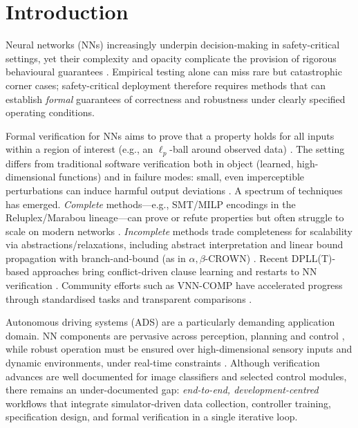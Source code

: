 
\section{Introduction}

Neural networks (NNs) increasingly underpin decision-making in safety-critical settings, yet their complexity and opacity complicate the provision of rigorous behavioural guarantees \cite{huang2020survey, liu2021algorithms}. Empirical testing alone can miss rare but catastrophic corner cases; safety-critical deployment therefore requires methods that can establish \emph{formal} guarantees of correctness and robustness under clearly specified operating conditions.

Formal verification for NNs aims to prove that a property holds for all inputs within a region of interest (e.g., an $\ell_p$-ball around observed data) \cite{katz2019marabou}. The setting differs from traditional software verification both in object (learned, high-dimensional functions) and in failure modes: small, even imperceptible perturbations can induce harmful output deviations \cite{carlini2019evaluating}. A spectrum of techniques has emerged. \emph{Complete} methods—e.g., SMT/MILP encodings in the Reluplex/Marabou lineage—can prove or refute properties but often struggle to scale on modern networks \cite{katz2017reluplex, katz2019marabou}. \emph{Incomplete} methods trade completeness for scalability via abstractions/relaxations, including abstract interpretation and linear bound propagation with branch-and-bound (as in $\alpha,\beta$-CROWN) \cite{gehr2018ai2, singh2019abstract, zhang2018efficient, xu2021fast, wang2021beta, zhou2024scalable}. Recent DPLL(T)-based approaches bring conflict-driven clause learning and restarts to NN verification \cite{duong2024dpllt}. Community efforts such as VNN-COMP have accelerated progress through standardised tasks and transparent comparisons \cite{bak2021second, brix2023fourth}.

Autonomous driving systems (ADS) are a particularly demanding application domain. NN components are pervasive across perception, planning and control \cite{bojarski2016end}, while robust operation must be ensured over high-dimensional sensory inputs and dynamic environments, under real-time constraints \cite{tran2020verification, dreossi2019verifai}. Although verification advances are well documented for image classifiers and selected control modules, there remains an under-documented gap: \emph{end-to-end, development-centred} workflows that integrate simulator-driven data collection, controller training, specification design, and formal verification in a single iterative loop.


